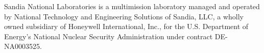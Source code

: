 \documentclass[letterpaper]{scrartcl}
\begin{document}
\vspace*{\fill}
\noindent
Sandia National Laboratories is a multimission laboratory managed and
operated by National Technology and Engineering Solutions of Sandia,
LLC, a wholly owned subsidiary of Honeywell International, Inc., for
the U.S. Department of Energy's National Nuclear Security
Administration under contract DE-NA0003525.
\end{document}
